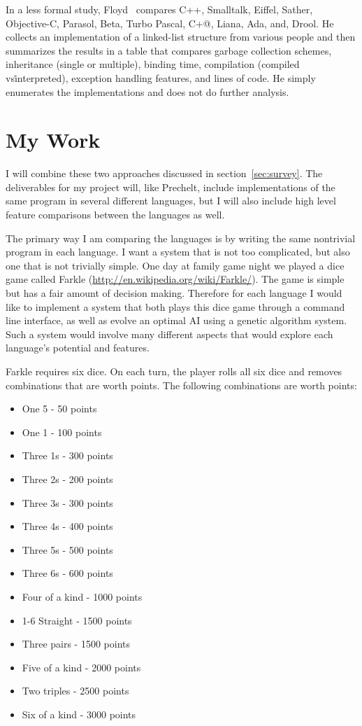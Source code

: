 \documentclass{article}
\begin{document}
In a less formal study, Floyd~\cite{DDJFloydeCompOOLangs} compares C++,
Smalltalk, Eiffel, Sather, Objective-C, Parasol, Beta, Turbo Pascal, C+@,
Liana, Ada, and, Drool.  He collects an implementation of a linked-list
structure from various people and then summarizes the results in a table that
compares garbage collection schemes, inheritance (single or multiple), binding
time, compilation (compiled vs\. interpreted), exception handling features, and
lines of code.  He simply enumerates the implementations and does not do
further analysis.

\section{My Work}

I will combine these two approaches discussed in section~\ref{sec:survey}.  The
deliverables for my project will, like Prechelt, include implementations of the
same program in several different languages, but I will also include high level
feature comparisons between the languages as well.

The primary way I am comparing the languages is by writing the same nontrivial
program in each language.  I want a system that is not too complicated, but also
one that is not trivially simple.  One day at family game night we played a dice
game called Farkle (\url{http://en.wikipedia.org/wiki/Farkle/}).  The game is
simple but has a fair amount of decision making.  Therefore for each language I
would like to implement a system that both plays this dice game through a command line
interface, as well as evolve an optimal AI using a genetic algorithm system.
Such a system would involve many different aspects that would explore each
language's potential and features.

Farkle requires six dice.  On each turn, the player rolls all six dice and
removes combinations that are worth points.  The following combinations are
worth points:

\begin{itemize}
\item One 5 - 50 points
\item One 1 - 100 points
\item Three 1s - 300 points
\item Three 2s - 200 points
\item Three 3s - 300 points
\item Three 4s - 400 points
\item Three 5s - 500 points
\item Three 6s - 600 points
\item Four of a kind - 1000 points
\item 1-6 Straight   - 1500 points
\item Three pairs    - 1500 points
\item Five of a kind - 2000 points
\item Two triples    - 2500 points
\item Six of a kind  - 3000 points
\end{itemize}
\end{document}
